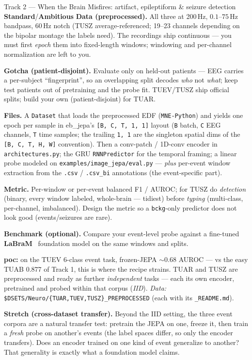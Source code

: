 \documentclass{article}
\newcommand{\code}[1]{\texttt{\small #1}}
\newcommand{\file}[1]{\texttt{\small #1}}
\newcommand{\diffmed}{\colorbox{ebamber!18}{\textcolor{ebamber}{\small\bfseries Standard}}}
\newcommand{\diffhard}{\colorbox{ebred!15}{\textcolor{ebred}{\small\bfseries Ambitious}}}
\begin{document}
\begin{trackbox}{Track 2 --- When the Brain Misfires: artifact, epileptiform \& seizure detection \hfill \diffmed{}/\diffhard{}}
\smallskip
\textbf{Data (preprocessed).} All three at 200\,Hz, $0.1$--$75$\,Hz bandpass, 60\,Hz
notch (TUSZ average-referenced; 19--23 channels depending on the bipolar montage the
labels need). The recordings ship continuous --- you must first \emph{epoch} them into
fixed-length windows; windowing and per-channel normalization are left to you.

\smallskip
\textbf{Gotcha (patient-disjoint).} Evaluate only on held-out patients --- EEG carries a
per-subject ``fingerprint'', so an overlapping split decodes \emph{who} not \emph{what};
keep test patients out of pretraining and the probe fit. TUEV/TUSZ ship official splits;
build your own (patient-disjoint) for TUAR.

\smallskip
\textbf{Files.} A \code{Dataset} that loads the preprocessed EDF (\code{MNE-Python}) and
yields one epoch per sample in eb\_jepa's \code{[B, C, T, 1, 1]} layout (\code{B} batch,
\code{C} EEG channels, \code{T} time samples; the trailing \code{1, 1} are the singleton
spatial dims of the \code{[B, C, T, H, W]} convention). Then a conv-patch / 1D-conv
encoder in \file{architectures.py}; the GRU \code{RNNPredictor} for the temporal framing;
a linear probe modeled on \file{examples/image\_jepa/eval.py} --- \emph{plus} per-event
window extraction from the \code{.csv} / \code{.csv\_bi} annotations (the event-specific
part).

\smallskip
\textbf{Metric.} Per-window or per-event balanced F1 / AUROC; for TUSZ do
\emph{detection} (binary, every window labeled, whole-brain --- tidiest) before
\emph{typing} (multi-class, per-channel, imbalanced). Design the metric so a
\code{bckg}-only predictor does not look good (events/seizures are rare).

\smallskip
\textbf{Benchmark (optional).} Compare your event-level probe against a fine-tuned
\textbf{LaBraM}~\citep{LaBraM} foundation model on the same windows and splits.

\smallskip
\textbf{poc:} on the TUEV 6-class event task, frozen-JEPA $\sim$0.68 AUROC --- vs the
easy TUAB 0.877 of Track 1, this is where the recipe strains. TUAR and TUSZ are
preprocessed and ready as further \emph{independent} tasks --- each its own encoder,
pretrained and probed within that corpus (\emph{IID}).
\emph{Data:} \code{\$DSETS/Neuro/\{TUAR,TUEV,TUSZ\}\_PREPROCESSED} (each with its
\code{*\_README.md}).

\smallskip
\textbf{Stretch (cross-dataset transfer).} Beyond the IID setting, the three event
corpora are a natural transfer test: pretrain the JEPA on one, freeze it, then train a
\emph{fresh} probe on another's events (the label spaces differ, so only the encoder
transfers). Does an encoder trained on one kind of event generalize to another? That
generality is exactly what a foundation model claims.
\end{trackbox}
\end{document}
